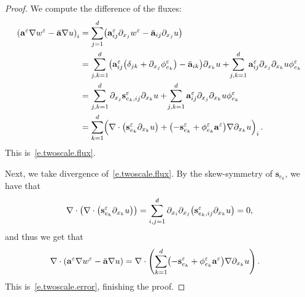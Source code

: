 \documentclass[11pt]{article} %
\numberwithin{equation}{section}
\theoremstyle{definition}
\let\originalleft\left
\let\originalright\right
\renewcommand{\left}{\mathopen{}\mathclose\bgroup\originalleft}
\renewcommand{\right}{\aftergroup\egroup\originalright}
\newcommand{\eps}{\varepsilon}
\newcommand{\s}{\mathbf{s}}
\newcommand{\ep}{\eps}
\renewcommand{\a}{\mathbf{a}}
\newcommand{\ahom}{\bar{\a}}
\begin{document}
\begin{proof}
We  compute the difference of the fluxes:
\begin{align*}
\left( \a^\ep \nabla w^\ep - \ahom \nabla u \right)_i
& = 
\sum_{j=1}^d
\left(
\a^\ep_{ij} \partial_{x_j} w^\ep 
- \ahom_{ij} \partial_{x_j} u
\right)
\notag \\ &
=
\sum_{j,k=1}^d
\left( \a^\ep_{ij}
\left( \delta_{jk} + \partial_{x_j} \phi^\ep_{e_k} \right)
- \ahom_{ik}\right)
\partial_{x_k}u
+\!
\sum_{j,k=1}^d 
\a^\ep_{ij} \partial_{x_j}\partial_{x_k} u \phi^\ep_{e_k}
\notag \\ & 
= 
\sum_{j,k=1}^d
\partial_{x_j} \s_{e_k,ij}^\ep \partial_{x_k}u
+\!
\sum_{j,k=1}^d 
\a^\ep_{ij} \partial_{x_j}\partial_{x_k} u \phi^\ep_{e_k}
\notag \\ & 
=
\sum_{k=1}^d \Bigl( 
\nabla \cdot \left( \s^\ep_{e_k}  \partial_{x_k} u  \right)
+
\bigl( - \s^\ep_{e_k} + \phi_{e_k}^\ep \a^\ep \bigr) \nabla \partial_{x_k} u
\Bigr)_i
\,.
\end{align*}
This is~\eqref{e.twoscale.flux}.

\smallskip

Next, we take divergence of~\eqref{e.twoscale.flux}. By the skew-symmetry of $\s_{e_k}$, we have that 
\begin{align*}  
\nabla \cdot  \left( \nabla \cdot \left( \s^\ep_{e_k}  \partial_{x_k} u  \right) \right) = \sum_{i,j=1}^d \partial_{x_i} \partial_{x_j} \left( \s_{e_k,ij}^\ep\partial_{x_k}u\right) = 0, 
\end{align*}
and thus we get that
\begin{align*}
\nabla \cdot 
\left( \a^\ep \nabla w^\ep - \ahom \nabla u \right)
&
= 
\nabla\cdot \left( \sum_{k=1}^d 
\left(
- \s_{e_k}^\ep 
+
\phi_{e_k}^\ep \a^\ep 
\right) \nabla \partial_{x_k} u \right)  \,.
\end{align*}
This is~\eqref{e.twoscale.error}, finishing the proof. 
\end{proof}
\end{document}
